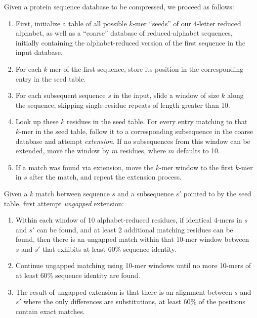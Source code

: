 \documentclass[review,preprint,12pt]{elsarticle}
\theoremstyle{definition}
\theoremstyle{remark}
\numberwithin{equation}{section}
\begin{document}
Given a protein sequence database to be compressed, we proceed as follows:
\begin{enumerate}
        \item First, initialize a table of all possible $k$-mer ``seeds'' of
        our 4-letter reduced alphabet, as well as a ``coarse'' database of
        reduced-alphabet sequences, initially containing the alphabet-reduced
        version of the first sequence in the input database.
        \item For each $k$-mer of the first sequence, store its position in the
        corresponding entry in the seed table.
        \item For each subsequent sequence $s$ in the input, slide a window of 
        size $k$ along the sequence, skipping single-residue repeats of length
        greater than 10.
        \item Look up these $k$ residues in the seed table.
        For every entry matching to that $k$-mer in the seed table, follow
        it to a corresponding subsequence in the coarse database and attempt
        \textit{extension}.
        If no subsequences from this window can be extended, move the window
        by $m$ residues, where $m$ defaults to 10.
        \item If a match was found via extension, move the $k$-mer window to
        the first $k$-mer in $s$ after the match, and repeat the extension
        process.
\end{enumerate}
        
Given a $k$ match between sequence $s$ and a subsequence $s'$ pointed to by the
seed table, first attempt \textit{ungapped} extension:
\begin{enumerate}
        \item Within each window of 10 alphabet-reduced residues, if identical 
        4-mers in $s$ and $s'$ can be found, and at least 2 additional matching 
        residues can be found, then there is an ungapped match within that
        10-mer window between $s$ and $s'$ that exhibits at least 60\% sequence
        identity.
        \item Continue ungapped matching using 10-mer windows until no more
        10-mers of at least 60\% sequence identity are found.
        \item The result of ungapped extension is that there is an alignment 
        between $s$ and $s'$ where the only differences are substitutions,
        at least 60\% of the positions contain exact matches.
\end{enumerate}
        
\end{document}
